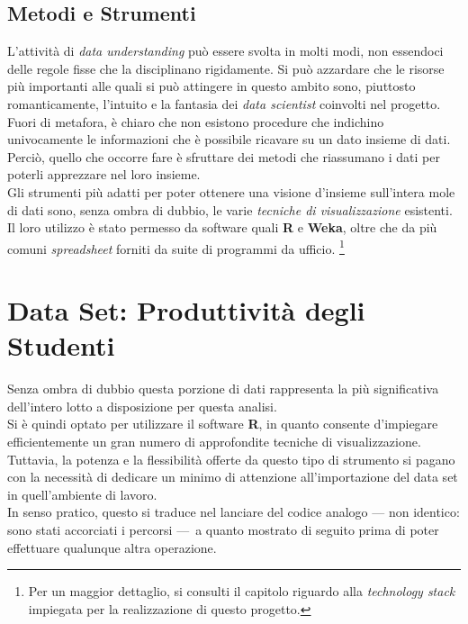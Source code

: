         \subsection{Metodi e Strumenti}

            L'attività di \textit{data understanding} può essere svolta in molti modi, non essendoci delle regole fisse che la disciplinano rigidamente. Si può azzardare che le risorse più importanti alle quali si può attingere in questo ambito sono, piuttosto romanticamente, l'intuito e la fantasia dei \textit{data scientist} coinvolti nel progetto. Fuori di metafora, è chiaro che non esistono procedure che indichino univocamente le informazioni che è possibile ricavare su un dato insieme di dati. Perciò, quello che occorre fare è sfruttare dei metodi che riassumano i dati per poterli apprezzare nel loro insieme. \\

            Gli strumenti più adatti per poter ottenere una visione d'insieme sull'intera mole di dati sono, senza ombra di dubbio, le varie \textit{tecniche di visualizzazione} esistenti. Il loro utilizzo è stato permesso da software quali \textbf{R} e \textbf{Weka}, oltre che da più comuni \textit{spreadsheet} forniti da suite di programmi da ufficio. \footnote{Per un maggior dettaglio, si consulti il capitolo riguardo alla \textit{technology stack} impiegata per la realizzazione di questo progetto.}

    \section{Data Set: Produttività degli Studenti}

        Senza ombra di dubbio questa porzione di dati rappresenta la più significativa dell'intero lotto a disposizione per questa analisi. \\

        Si è quindi optato per utilizzare il software \textbf{R}, in quanto consente d'impiegare efficientemente un gran numero di approfondite tecniche di visualizzazione. Tuttavia, la potenza e la flessibilità offerte da questo tipo di strumento si pagano con la necessità di dedicare un minimo di attenzione all'importazione del data set in quell'ambiente di lavoro. \\

        In senso pratico, questo si traduce nel lanciare del codice analogo \footnotesize{--- non identico: sono stati accorciati i percorsi ---}\normalsize\ a quanto mostrato di seguito prima di poter effettuare qualunque altra operazione. \\


